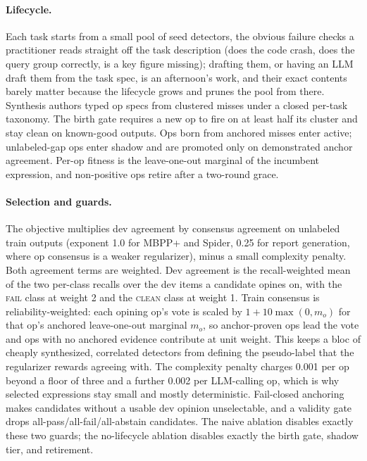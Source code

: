 \documentclass[letterpaper]{article} %
\begin{document}
\paragraph{Lifecycle.} Each task starts from a small pool of seed detectors, the obvious failure checks a practitioner reads straight off the task description (does the code crash, does the query group correctly, is a key figure missing); drafting them, or having an LLM draft them from the task spec, is an afternoon's work, and their exact contents barely matter because the lifecycle grows and prunes the pool from there. Synthesis authors typed op specs from clustered misses under a closed per-task taxonomy. The birth gate requires a new op to fire on at least half its cluster and stay clean on known-good outputs. Ops born from anchored misses enter active; unlabeled-gap ops enter shadow and are promoted only on demonstrated anchor agreement. Per-op fitness is the leave-one-out marginal of the incumbent expression, and non-positive ops retire after a two-round grace.

\paragraph{Selection and guards.} The objective multiplies dev agreement by consensus agreement on unlabeled train outputs (exponent 1.0 for MBPP+ and Spider, 0.25 for report generation, where op consensus is a weaker regularizer), minus a small complexity penalty. Both agreement terms are weighted. Dev agreement is the recall-weighted mean of the two per-class recalls over the dev items a candidate opines on, with the \textsc{fail} class at weight 2 and the \textsc{clean} class at weight 1. Train consensus is reliability-weighted: each opining op's vote is scaled by $1 + 10 \max(0, m_o)$ for that op's anchored leave-one-out marginal $m_o$, so anchor-proven ops lead the vote and ops with no anchored evidence contribute at unit weight. This keeps a bloc of cheaply synthesized, correlated detectors from defining the pseudo-label that the regularizer rewards agreeing with. The complexity penalty charges 0.001 per op beyond a floor of three and a further 0.002 per LLM-calling op, which is why selected expressions stay small and mostly deterministic. Fail-closed anchoring makes candidates without a usable dev opinion unselectable, and a validity gate drops all-pass/all-fail/all-abstain candidates. The naive ablation disables exactly these two guards; the no-lifecycle ablation disables exactly the birth gate, shadow tier, and retirement.
\end{document}
